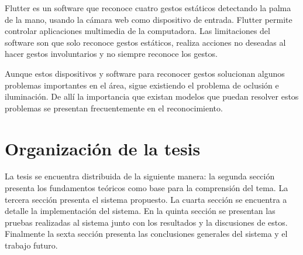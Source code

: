 Flutter  es un software que reconoce cuatro gestos est\'aticos detectando la palma de la mano, usando la c\'amara web como dispositivo de entrada. Flutter permite controlar aplicaciones multimedia de la computadora. 	Las limitaciones del software son que solo reconoce gestos est\'aticos, realiza acciones no deseadas al hacer gestos involuntarios y no siempre reconoce los gestos. 

Aunque estos dispositivos y software para reconocer gestos  solucionan algunos problemas importantes en el \'area, sigue existiendo el problema de oclusi\'on  e iluminaci\'on. De allí la importancia que existan modelos que puedan resolver estos problemas se presentan frecuentemente en el reconocimiento. 

\section{Organizaci\'on de la tesis}\label{sec:OrganizacionTesis}
La tesis se encuentra distribuida de la siguiente manera: la segunda sección presenta los fundamentos teóricos como base para la comprensión del tema. La tercera sección presenta el sistema propuesto. La cuarta sección se encuentra a detalle la implementación del sistema. En la quinta sección se presentan las pruebas realizadas al sistema junto con los resultados y la discusiones de estos. Finalmente la sexta sección presenta las conclusiones generales del sistema y el trabajo futuro. 
	

\newpage









